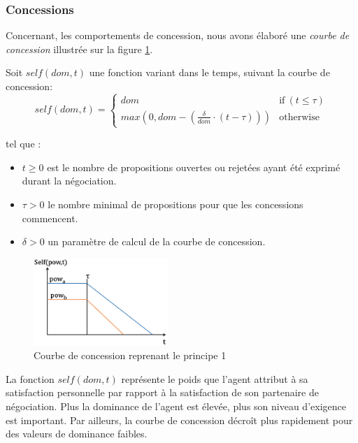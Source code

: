 	\subsubsection{Concessions}
	
	Concernant, les comportements de concession, nous avons élaboré une \emph {courbe de concession} illustrée sur la figure \ref{fig:conc}. 
	

	Soit $ self (dom, t) $ une fonction variant dans le temps, suivant la courbe de concession:
	\begin{equation}
	self(dom, t) = \left\{\begin{array}{ll}
	dom & \mathrm{if\ } (t \leq \tau)\\
	max(0, dom - (\frac{\delta}{dom} \cdot (t - \tau))) & \mathrm{otherwise}
	\end{array}\right.
	\end{equation}
	
	
	
	tel que :
	\begin{itemize}
		\item $t \geq 0$ est le nombre de propositions ouvertes ou rejetées ayant été exprimé durant la négociation.
		\item $\tau > 0$ le nombre minimal de propositions pour que les concessions commencent.
		\item  $\delta > 0$ un paramètre de calcul de la courbe de concession.
		
	\end{itemize}  
			

	
		\begin{figure}[h]
			\includegraphics[width=2in]{Figures/chap4/self.png}
			\caption{\label{fig:conc}Courbe de concession reprenant le principe 1}
		\end{figure} 
		
		La fonction $self(dom,t)$ représente le poids que l'agent attribut à sa satisfaction personnelle par rapport à la satisfaction de son partenaire de négociation. Plus la dominance de l'agent est élevée, plus son niveau d'exigence est important. Par ailleurs, la courbe de concession décroît plus rapidement pour des valeurs de dominance faibles.
		
